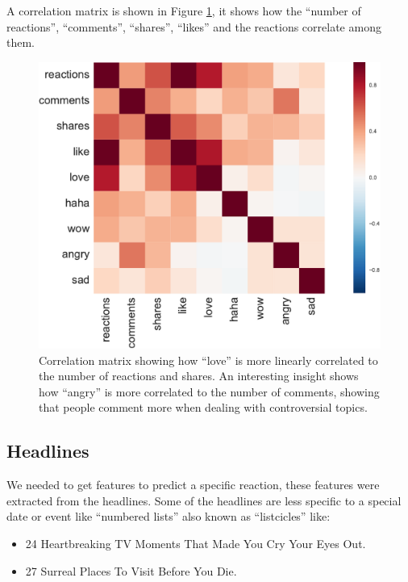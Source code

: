 \documentclass[11pt]{article}
\begin{document}
A correlation matrix is shown in Figure \ref{fig:corr}, it shows how the ``number of reactions'', ``comments'', ``shares'', ``likes'' and the reactions correlate among them.

\begin{figure}[ht!]
\centering
\includegraphics[width=1.0\columnwidth]{../3_notebooks/notebook_figures/corr_mat.pdf}
\caption{Correlation matrix showing how ``love'' is more linearly correlated to the number of reactions and shares. An interesting insight shows how ``angry'' is more correlated to the number of comments, showing that people comment more when dealing with controversial topics.}
\label{fig:corr}
\end{figure}

\subsection{Headlines}

We needed to get features to predict a specific reaction, these features were extracted from the headlines. Some of the headlines are less specific to a special date or event like ``numbered lists'' also known as ``listcicles'' like:
\begin{itemize}
 \item 24 Heartbreaking TV Moments That Made You Cry Your Eyes Out.
 \item 27 Surreal Places To Visit Before You Die.
\end{itemize}
\end{document}
